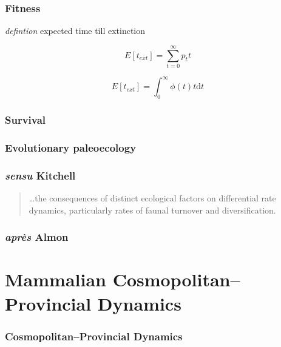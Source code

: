 \documentclass{beamer}
\begin{document}
\begin{frame}
  \frametitle{Fitness}

  \begin{block}{\emph{defintion}}
    expected time till extinction 
    \tiny{}
  \end{block}

  \begin{equation}
    E[t_{ext}] = \sum_{t = 0}^{\infty} p_{t} t
  \end{equation}

  \begin{equation}
    E[t_{ext}] = \int_{0}^{\infty} \phi(t) t \mathrm{d}t
  \end{equation}

\end{frame}

\begin{frame}
  \frametitle{Survival}

\end{frame}

\begin{frame}
  \frametitle{Evolutionary paleoecology}

\end{frame}

\begin{frame}
  \frametitle{\textit{sensu} Kitchell}

  \begin{quotation}
    \dots the consequences of distinct ecological factors on differential rate dynamics, particularly rates of faunal turnover and diversification.

  \end{quotation}

\end{frame}

\begin{frame}
  \frametitle{\textit{apr\`{e}s} Almon}


\end{frame}

\section{Mammalian Cosmopolitan--Provincial Dynamics}
\begin{frame}
  \frametitle{Cosmopolitan--Provincial Dynamics}

\end{frame}
\end{document}
